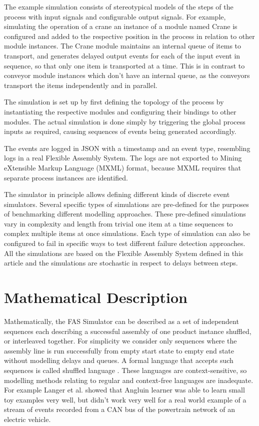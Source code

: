 \documentclass[journal]{IEEEtran}
\begin{document}
The example simulation consists of stereotypical models of the steps of the process with input signals and configurable output signals. For example, simulating
the operation of a crane an instance of a module named Crane is configured and added to the respective position in the process in relation to other module instances.
The Crane module maintains an internal queue of items to transport, and generates delayed output events for each of the input event in sequence, so that only one item is
transported at a time. This is in contrast to conveyor module instances which don't have an internal queue, as the conveyors transport the items independently and in parallel.

The simulation is set up by first defining the topology of the process by instantiating the respective modules and configuring their bindings to other modules. The actual simulation
is done simply by triggering the global process inputs as required, causing sequences of events being generated accordingly.

The events are logged in JSON with a timestamp and an event type, resembling logs in a real Flexible Assembly System. The logs are not exported to
Mining eXtensible Markup Language (MXML) format, because MXML requires that separate process instances are identified.

The simulator in principle allows defining different kinds of discrete event simulators. Several specific types of simulations are pre-defined for the purposes of benchmarking
different modelling approaches. These pre-defined simulations vary in complexity and length from trivial one item at a time sequences to complex multiple items at once simulations.
Each type of simulation can also be configured to fail in specific ways to test different failure detection approaches. All the simulations are based on the Flexible Assembly System
defined in this article and the simulations are stochastic in respect to delays between steps.

\section{Mathematical Description}

Mathematically, the FAS Simulator can be described as a set of independent sequences each describing a successful assembly of one product instance shuffled, or interleaved
together.
For simplicity we consider only sequences where the assembly line is run successfully from empty start state to empty end state without modelling delays and queues.
A formal language that accepts such sequences is called shuffled language \cite{berglund2011recognizing}. These languages are context-sensitive, so modelling methods
relating to regular and context-free languages are inadequate. For example Langer et al. \cite{langer2011self} showed that Angluin learner was able to learn small
toy examples very well, but didn't work very well for a real world example of a stream of events recorded from a CAN bus of the powertrain network of an electric vehicle.
\end{document}
